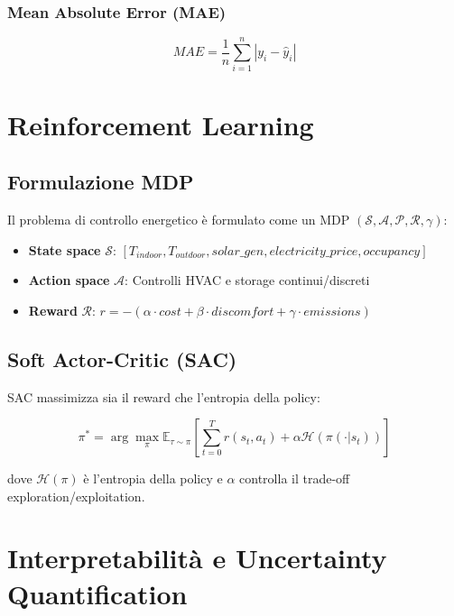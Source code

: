 \documentclass[12pt,a4paper,twoside]{report}
\begin{document}
\subsubsection{Mean Absolute Error (MAE)}
\begin{equation}
MAE = \frac{1}{n} \sum_{i=1}^{n} |y_i - \hat{y}_i|
\end{equation}

\section{Reinforcement Learning}

\subsection{Formulazione MDP}

Il problema di controllo energetico è formulato come un MDP $(\mathcal{S}, \mathcal{A}, \mathcal{P}, \mathcal{R}, \gamma)$:

\begin{itemize}
    \item \textbf{State space} $\mathcal{S}$: $[T_{indoor}, T_{outdoor}, solar\_gen, electricity\_price, occupancy]$
    \item \textbf{Action space} $\mathcal{A}$: Controlli HVAC e storage continui/discreti
    \item \textbf{Reward} $\mathcal{R}$: $r = -(\alpha \cdot cost + \beta \cdot discomfort + \gamma \cdot emissions)$
\end{itemize}

\subsection{Soft Actor-Critic (SAC)}

SAC massimizza sia il reward che l'entropia della policy:

\begin{equation}
\pi^* = \arg\max_{\pi} \mathbb{E}_{\tau \sim \pi} \left[ \sum_{t=0}^{T} r(s_t, a_t) + \alpha \mathcal{H}(\pi(\cdot|s_t)) \right]
\end{equation}

dove $\mathcal{H}(\pi)$ è l'entropia della policy e $\alpha$ controlla il trade-off exploration/exploitation.

\section{Interpretabilità e Uncertainty Quantification}
\end{document}
